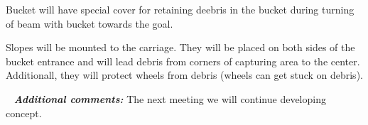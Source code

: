 \begin{enumerate*}
  	Bucket will have special cover for retaining deebris in the bucket during turning of beam with bucket towards the goal.
  	\begin{figure}[H]
  		\begin{minipage}[h]{1\linewidth}
  			\caption{}
  		\end{minipage}
  	\end{figure}
  	\item Slopes will be mounted to the carriage. They will be placed on both sides of the bucket entrance and will lead debris from corners of capturing area to the center. Additionall, they will protect wheels from debris (wheels can get stuck on debris).
  	\begin{figure}[H]
  		\begin{minipage}[h]{1\linewidth}
  			\caption{}
  		\end{minipage}
  	\end{figure}
  	
  \end{enumerate*}
  
   \newline
  \textit{\textbf{Additional comments:}} The next meeting we will continue developing concept.

\fillpage
